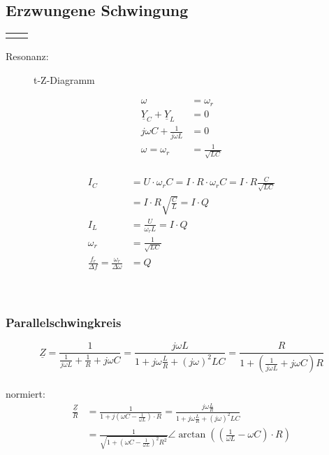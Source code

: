 \subsection{Erzwungene Schwingung}

\begin{tabular}{ll}
	&
	
\end{tabular}

Resonanz:\\
\begin{wrapfigure}{l}{0.5\textwidth}
	\centering
	
	\caption{t-Z-Diagramm}
	\label{fig:tZDiagramm}
\end{wrapfigure}

\begin{align}
	\omega&=\omega_r\nonumber\\
	\underline{Y}_C +\underline{Y}_L &= 0\nonumber\\
	j\omega C+\frac{1}{j\omega L} &= 0\nonumber\\
	\omega=\omega_r&=\frac{1}{\sqrt{LC}}\nonumber
	\end{align}\\
	\begin{align}
	I_C&=U\cdot\omega_rC=I\cdot R \cdot \omega_rC=I\cdot R
	\frac{C}{\sqrt{LC}}\nonumber\\
	&=I\cdot R \sqrt{\frac{C}{L}} = I \cdot Q\nonumber\\
	I_L&=\frac{U}{\omega_rL}=I \cdot Q\nonumber\\
	\omega_r&=\frac{1}{\sqrt{LC}}\nonumber\\
	\frac{f_r}{\Delta f}=\frac{\omega_r}{\Delta \omega} &= Q\nonumber
\end{align}\\
\\

\subsubsection{Parallelschwingkreis}
$$\underline{Z} = \frac{1}{\frac{1}{j\omega L}+\frac{1}{R} + j \omega C}
= \frac{j\omega L}{1+j\omega \frac{L}{R}+(j\omega)^2LC}
= \frac{R}{1+(\frac{1}{j\omega L}+j\omega C)R}$$\\
normiert:\\
\begin{align}
\frac{\underline{Z}}{R}&=\frac{1}{1+j(\omega C-\frac{1}{\omega L})\cdot R}
=\frac{j\omega \frac{L}{R}}{1+j\omega\frac{L}{R}+(j\omega)^2LC}\nonumber\\
&=\frac{1}{\sqrt{1+(\omega C - \frac{1}{\omega
L})^2R^2}} \angle \arctan{((\frac{1}{\omega L}-\omega C)\cdot R)} \nonumber
\end{align}\\

